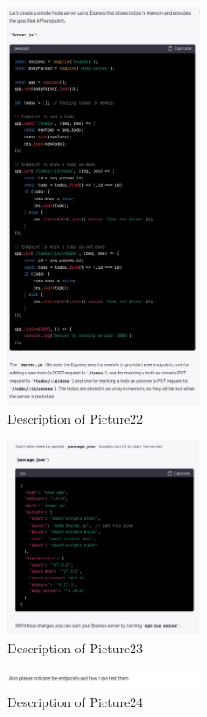 \documentclass[runningheads]{llncs}
\begin{document}
\begin{figure}[h]
    \centering
    \includegraphics[width=0.5\textwidth]{Pictures/Picture22.jpg}
    \caption{Description of Picture22}
    \label{fig:picture22}
\end{figure}
\begin{figure}[h]
    \centering
    \includegraphics[width=0.5\textwidth]{Pictures/Picture23.jpg}
    \caption{Description of Picture23}
    \label{fig:picture23}
\end{figure}
\begin{figure}[h]
    \centering
    \includegraphics[width=0.5\textwidth]{Pictures/Picture24.jpg}
    \caption{Description of Picture24}
    \label{fig:picture24}
\end{figure}
\end{document}
